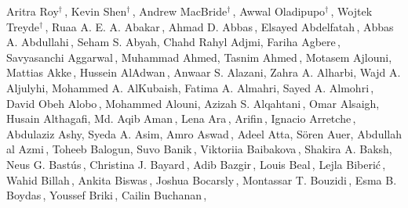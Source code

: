 
\begin{center}
Aritra Roy$^\dagger$\,,\;
Kevin Shen$^\dagger$\,,\;
Andrew MacBride$^\dagger$\,,\;
Awwal Oladipupo$^\dagger$\,,\;
Wojtek Treyde$^\dagger$\,,\;
Ruaa A. E. A. Abakar\,,\;
Ahmad D. Abbas\,,\;
Elsayed Abdelfatah\,,\;
Abbas A. Abdullahi\,,\;
Seham S. Abyah,\;
Chahd Rahyl Adjmi,\;
Fariha Agbere\,,\;
Savyasanchi Aggarwal\,,\;
Muhammad Ahmed,\;
Tasnim Ahmed\,,\;
Motasem Ajlouni,\;
Mattias Akke\,,\;
Hussein AlAdwan\,,\;
Anwaar S. Alazani,\;
Zahra A. Alharbi,\;
Wajd A. Aljulyhi,\;
Mohammed A. AlKubaish,\;
Fatima A. Almahri,\;
Sayed A. Almohri\,,\;
David Obeh Alobo\,,\;
Mohammed Alouni,\;
Azizah S. Alqahtani\,,\;
Omar Alsaigh,\;
Husain Althagafi,\;
Md. Aqib Aman\,,\;
Lena Ara\,,\;
Arifin\,,\;
Ignacio Arretche\,,\;
Abdulaziz Ashy,\;
Syeda A. Asim,\;
Amro Aswad\,,\;
Adeel Atta,\;
Sören Auer,\;
Abdullah al Azmi\,,\;
Toheeb Balogun,\;
Suvo Banik\,,\;
Viktoriia Baibakova\,,\;
Shakira A. Baksh,\;
Neus G. Bastús\,,\;
Christina J. Bayard\,,\;
Adib Bazgir\,,\;
Louis Beal\,,\;
Lejla Biberić\,,\;
Wahid Billah\,,\;
Ankita Biswas\,,\;
Joshua Bocarsly\,,\;
Montassar T. Bouzidi\,,\;
Esma B. Boydas\,,\;
Youssef Briki\,,\;
Cailin Buchanan\,,\;

\end{center}
